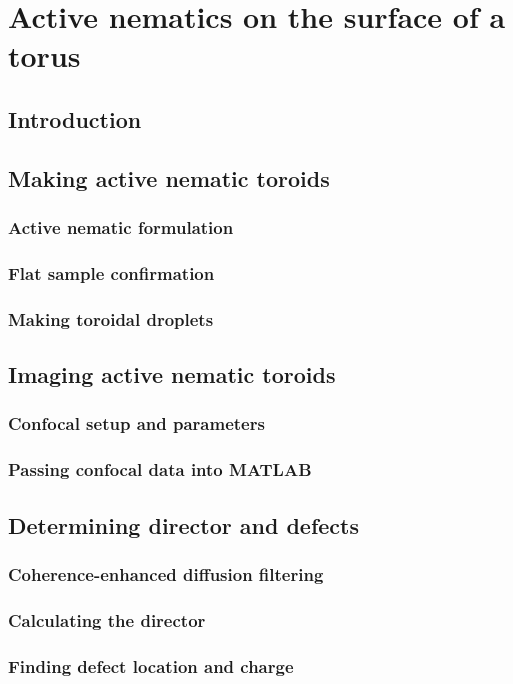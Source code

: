 \chapter{Active nematics on the surface of a torus}

\section{Introduction}

\section{Making active nematic toroids}
\subsection{Active nematic formulation}
\subsection{Flat sample confirmation}
\subsection{Making toroidal droplets}

\section{Imaging active nematic toroids}
\subsection{Confocal setup and parameters}
\subsection{Passing confocal data into MATLAB}

\section{Determining director and defects}
\subsection{Coherence-enhanced diffusion filtering}
\subsection{Calculating the director}
\subsection{Finding defect location and charge}
